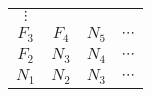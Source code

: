 \begin{center}
	\begin{tabular}{ c c c c }
		$\vdots$           &                    &       &          \\
		{\color{red}$F_3$} & {\color{red}$F_4$} & $N_5$ & $\cdots$ \\
		{\color{red}$F_2$} & $N_3$              & $N_4$ & $\cdots$ \\
		$N_1$              & $N_2$              & $N_3$ & $\cdots$
	\end{tabular}
\end{center}